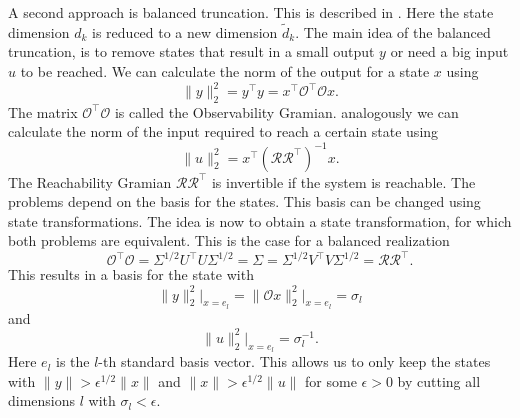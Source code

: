 \documentclass[doctype=mastersthesis,BCOR=15mm,biblatex]{ldvbook}%
\newcommand{\R}{\mathcal{R}} %
\newcommand{\Ob}{\mathcal{O}} %
\begin{document}
A second approach is balanced truncation. 
This is described in \cite{sandberg_balanced_2004,hinrichsen_improved_1990}. 
Here the state dimension $d_k$ is reduced to a new dimension $\tilde{d}_k$.
The main idea of the balanced truncation, is to remove states that result in a small output $y$ or need a big input $u$ to be reached.
We can calculate the norm of the output for a state $x$ using
\begin{equation}
	\|y\|_2^2 = y^\top y = x^\top \Ob^\top \Ob x
	.
\end{equation}
The matrix $\Ob^\top \Ob$ is called the Observability Gramian.
analogously we can calculate the norm of the input required to reach a certain state using
\begin{equation}
	\|u\|_2^2 = x^\top (\R\R^\top)^{-1} x
	.
\end{equation}
The Reachability Gramian $\R\R^\top$ is invertible if the system is reachable.
The problems depend on the basis for the states. This basis can be changed using state transformations.
The idea is now to obtain a state transformation, for which both problems are equivalent. 
This is the case for a balanced realization
\begin{equation}
	\Ob^\top \Ob = \Sigma^{1/2}U^\top U\Sigma^{1/2} = \Sigma = \Sigma^{1/2} V^\top V \Sigma^{1/2} = \R \R^\top 
	.
\end{equation}
This results in a basis for the state with 
\begin{equation}
	\|y\|_2^2\big|_{x = e_l} = \|\Ob x\|_2^2\big|_{x = e_l} = \sigma_l
\end{equation}
and 
\begin{equation}
\|u\|_2^2\big|_{x = e_l} = \sigma_l^{-1}
.
\end{equation}
Here $e_l$ is the $l$-th standard basis vector.
This allows us to only keep the states with $\|y\| > \epsilon^{1/2} \|x\|$ and $\|x\| > \epsilon^{1/2} \|u\| $ for some $\epsilon>0$ by cutting all dimensions $l$ with $\sigma_l < \epsilon$.
\end{document}
